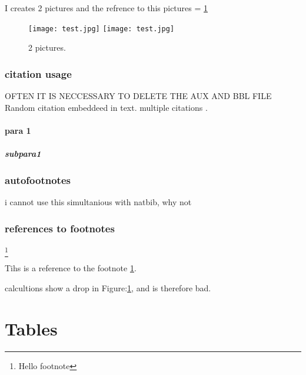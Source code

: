 \documentclass{article}
\begin{document}
I creates 2 pictures and the refrence to this pictures = \ref{fig:2pictures}


\begin{figure}[b] 
 
  \texttt{[image: test.jpg]}
  \texttt{[image: test.jpg]}
  \caption{2 pictures.}
  \label{fig:2pictures}
\end{figure}

\FloatBarrier %
\subsubsection{citation usage}
OFTEN IT IS NECCESSARY TO DELETE THE AUX AND BBL FILE
Random citation  \citet{DUMMY:1} embeddeed in text.
multiple citations \cite{DUMMY:2,DUMMY:1}.

\paragraph{para 1}
\subparagraph{subpara1}
 
\subsubsection{autofootnotes} 
i cannot use this simultanious with natbib, why not


\subsubsection{references to footnotes}
\footnote{\label{myfootnote}Hello footnote}

Tihs is a reference to the footnote \ref{myfootnote}.

calcultions show a drop in Figure:\ref{fig:2pictures}, and is therefore bad.
\tableofcontents %
\newpage


\section{Tables}
\end{document}
